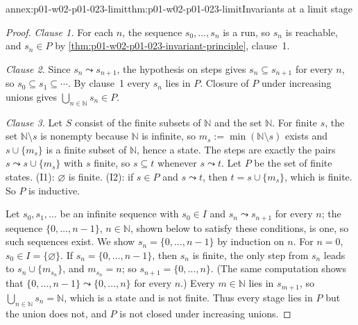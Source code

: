 \begin{annexitem}{annex:p01-w02-p01-023-limit}{thm:p01-w02-p01-023-limit}{Invariants at a limit stage}
\begin{proof}
\emph{Clause 1.} For each \(n\), the sequence \(s_0,\ldots,s_n\) is a run,
so \(s_n\) is reachable, and \(s_n\in P\) by
\cref{thm:p01-w02-p01-023-invariant-principle}, clause~1.

\emph{Clause 2.} Since \(s_n\leadsto s_{n+1}\), the hypothesis on steps
gives \(s_n\subseteq s_{n+1}\) for every \(n\), so
\(s_0\subseteq s_1\subseteq\cdots\). By clause~1 every \(s_n\) lies in
\(P\). Closure of \(P\) under increasing unions gives
\(\bigcup_{n\in\mathbb N}s_n\in P\).

\emph{Clause 3.} Let \(S\) consist of the finite subsets of \(\mathbb N\)
and the set \(\mathbb N\). For finite \(s\), the set
\(\mathbb N\setminus s\) is nonempty because \(\mathbb N\) is infinite, so
\(m_s:=\min(\mathbb N\setminus s)\) exists and \(s\cup\{m_s\}\) is a finite
subset of \(\mathbb N\), hence a state. The steps are exactly the pairs
\(s\leadsto s\cup\{m_s\}\) with \(s\) finite, so \(s\subseteq t\) whenever
\(s\leadsto t\). Let \(P\) be the set of finite states. (I1): \(\varnothing\)
is finite. (I2): if \(s\in P\) and \(s\leadsto t\), then
\(t=s\cup\{m_s\}\), which is finite. So \(P\) is inductive.

Let \(s_0,s_1,\ldots\) be an infinite sequence with \(s_0\in I\) and
\(s_n\leadsto s_{n+1}\) for every \(n\); the sequence
\(\{0,\ldots,n-1\}\), \(n\in\mathbb N\), shown below to satisfy these
conditions, is one, so such sequences exist. We show
\(s_n=\{0,\ldots,n-1\}\) by induction on \(n\). For \(n=0\),
\(s_0\in I=\{\varnothing\}\). If \(s_n=\{0,\ldots,n-1\}\), then \(s_n\) is
finite, the only step from \(s_n\) leads to \(s_n\cup\{m_{s_n}\}\), and
\(m_{s_n}=n\); so \(s_{n+1}=\{0,\ldots,n\}\). (The same computation shows
that \(\{0,\ldots,n-1\}\leadsto\{0,\ldots,n\}\) for every \(n\).) Every
\(m\in\mathbb N\) lies in \(s_{m+1}\), so
\(\bigcup_{n\in\mathbb N}s_n=\mathbb N\), which is a state and is not
finite. Thus every stage lies in \(P\) but the union does not, and \(P\) is
not closed under increasing unions.
\end{proof}
\end{annexitem}

